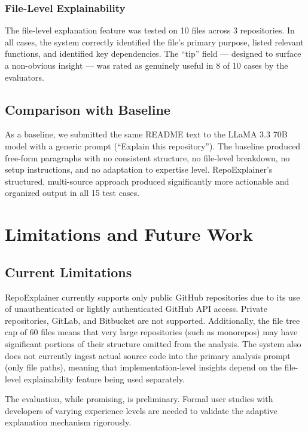 \documentclass[conference]{IEEEtran}
\begin{document}
\subsubsection{File-Level Explainability}

The file-level explanation feature was tested on 10 files across 3 repositories. In all cases, the system correctly identified the file's primary purpose, listed relevant functions, and identified key dependencies. The ``tip'' field --- designed to surface a non-obvious insight --- was rated as genuinely useful in 8 of 10 cases by the evaluators.

\subsection{Comparison with Baseline}

As a baseline, we submitted the same README text to the LLaMA 3.3 70B model with a generic prompt (``Explain this repository''). The baseline produced free-form paragraphs with no consistent structure, no file-level breakdown, no setup instructions, and no adaptation to expertise level. RepoExplainer's structured, multi-source approach produced significantly more actionable and organized output in all 15 test cases.

\section{Limitations and Future Work}

\subsection{Current Limitations}

RepoExplainer currently supports only public GitHub repositories due to its use of unauthenticated or lightly authenticated GitHub API access. Private repositories, GitLab, and Bitbucket are not supported. Additionally, the file tree cap of 60 files means that very large repositories (such as monorepos) may have significant portions of their structure omitted from the analysis. The system also does not currently ingest actual source code into the primary analysis prompt (only file paths), meaning that implementation-level insights depend on the file-level explainability feature being used separately.

The evaluation, while promising, is preliminary. Formal user studies with developers of varying experience levels are needed to validate the adaptive explanation mechanism rigorously.
\end{document}
